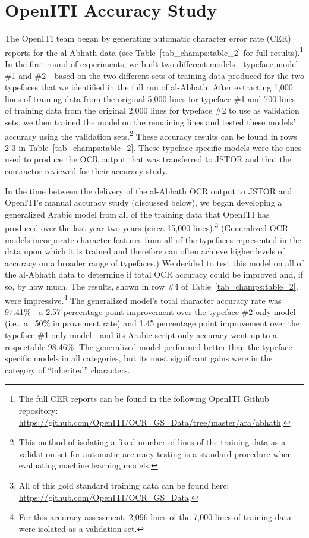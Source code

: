 \section{OpenITI Accuracy Study}

The OpenITI team began by generating automatic character error rate (CER)
reports for the al-Abhath data (see Table~\ref{tab_champs:table_2} for full
results).\footnote{The full CER reports can be found in the following OpenITI
Github repository:
\url{https://github.com/OpenITI/OCR_GS_Data/tree/master/ara/abhath}.} In the
first round of experiments, we built two different models—typeface model \#1
and \#2—based on the two different sets of training data produced for the two
typefaces that we identified in the full run of al-Abhath. After extracting
1,000 lines of training data from the original 5,000 lines for typeface \#1 and
700 lines of training data from the original 2,000 lines for typeface \#2 to
use as validation sets, we then trained the model on the remaining lines and
tested these models’ accuracy using the validation sets.\footnote{This method
of isolating a fixed number of lines of the training data as a validation set
for automatic accuracy testing is a standard procedure when evaluating machine
learning models.} These accuracy results can be found in rows 2-3 in
Table~\ref{tab_champs:table_2}.  These typeface-specific models were the ones
used to produce the OCR output that was transferred to JSTOR and that the
contractor reviewed for their accuracy study.

In the time between the delivery of the al-Abhath OCR output to JSTOR and
OpenITI’s manual accuracy study (discussed below), we began developing a
generalized Arabic model from all of the training data that OpenITI has
produced over the last year two years (circa 15,000 lines).\footnote{All of
this gold standard training data can be found here:
\url{https://github.com/OpenITI/OCR_GS_Data}.} (Generalized OCR models
incorporate character features from all of the typefaces represented in the
data upon which it is trained and therefore can often achieve higher levels of
accuracy on a broader range of typefaces.) We decided to test this model on all
of the al-Abhath data to determine if total OCR accuracy could be improved and,
if so, by how much. The results, shown in row \#4 of Table~\ref{tab_champs:table_2}, were
impressive.\footnote{For this accuracy assessment, 2,096 lines of the 7,000
lines of training data were isolated as a validation set.} The generalized
model’s  total character accuracy rate was 97.41\% - a 2.57 percentage point
improvement over the typeface \#2-only model (i.e., a ~50\% improvement rate)
and 1.45 percentage point improvement over the typeface \#1-only model - and
its Arabic script-only accuracy went up to a respectable 98.46\%. The
generalized model performed better than the typeface-specific models in all
categories, but its most significant gains were in the category of “inherited”
characters.

